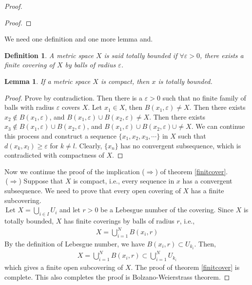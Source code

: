 \documentclass[12pt,leqno]{amsart}
\newtheorem{lemma}[theorem]{Lemma}
\newtheorem{definition}{Definition}[section]
\theoremstyle{definition}
\begin{document}
\begin{proof}
\begin{proof}
\end{proof}
We need one definition and one more lemma and.
\begin{definition}
A metric space $X$ is said totally bounded if $\forall \varepsilon>0$, there exists a finite covering of $X$ by balls of radius $\varepsilon$.
\end{definition}
\begin{lemma}
If a metric space $X$ is compact, then $x$ is totally bounded.
\end{lemma}
\begin{proof}Prove by contradiction. Then there is a $\varepsilon>0$ such that no finite family of balls with radius $\varepsilon$ covers $X$. Let $x_1\in X$, then $B(x_1,\varepsilon)\neq X$. Then there exists $x_2\notin B(x_1,\varepsilon)$, and $B(x_1,\varepsilon)\cup B(x_2,\varepsilon)\neq X$. Then there exists $x_3\notin B(x_1,\varepsilon)\cup B(x_2,\varepsilon)$, and $B(x_1,\varepsilon)\cup B(x_2,\varepsilon)\cup\neq X$. We can continue this process and construct a sequence $\{x_1,x_2,x_3,\cdots\}$ in $X$ such that $d(x_k,x_l)\geq \varepsilon$ for $k\neq l$. Clearly, $\{x_n\}$ has no convergent subsequence, which is contradicted with compactness of $X$.
\end{proof}

Now we continue the proof of the implication ($\Rightarrow$) of theorem \ref{finitcover}. \\
\hspace*{1em}\,($\Rightarrow$) Suppose that $X$ is compact, i.e., every sequence in $x$ has a convergent subsequence. We need to prove that every open covering of $X$ has a finite subcovering. \\
\hspace*{1em}\,Let $X = \bigcup_{i\in I}U_i$ and let $r>0$ be a Lebesgue number of the covering. Since $X$ is totally bounded, $X$ has finite coverings by balls of radius $r$, i.e.,
\begin{align*}
    X = \bigcup^N_{i=1}B(x_i,r)
\end{align*}
By the definition of Lebesgue number, we have $B(x_i,r)\subset U_{k_i}$. Then,
\begin{align*}
    X = \bigcup^N_{i=1}B(x_i,r) \subset \bigcup^N_{i=1}U_{k_i}
\end{align*}
which gives a finite open subcovering of $X$. The proof of theorem \ref{finitcover} is complete. This also completes the proof is Bolzano-Weierstrass theorem.
\end{proof}
\end{document}
